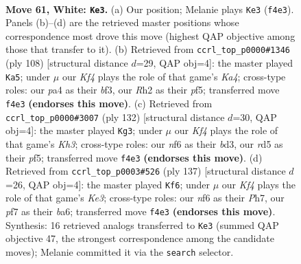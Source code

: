 \documentclass[11pt]{article}
\begin{document}
\clearpage

\begin{figure}[p]\centering
\begin{subfigure}{0.46\textwidth}\centering
\resizebox{\linewidth}{!}{%
\newchessgame
\chessboard[
  setfen={7k/5p2/5n2/3r4/pB3K1p/P4P1P/7R/8 w - - 1 61},
  showmover=false,
  pgfstyle=straightmove, color=movearrow, markmove={f4-e3}
]}
\caption{}
\end{subfigure}\hfill
\begin{subfigure}{0.46\textwidth}\centering
\resizebox{\linewidth}{!}{%
\newchessgame
\chessboard[
  setfen={8/7p/3B3P/2P2pp1/K1k5/P4bP1/8/8 w - - 1 55},
  showmover=false,
  pgfstyle=straightmove, color=movearrow, markmove={a4-a5}
]}
\caption{}
\end{subfigure}
\\[4pt]
\begin{subfigure}{0.46\textwidth}\centering
\resizebox{\linewidth}{!}{%
\newchessgame
\chessboard[
  setfen={8/7p/2p5/5p1k/p4P2/P1Bb3K/1P5P/8 w - - 17 67},
  showmover=false,
  pgfstyle=straightmove, color=movearrow, markmove={h3-g3}
]}
\caption{}
\end{subfigure}\hfill
\begin{subfigure}{0.46\textwidth}\centering
\resizebox{\linewidth}{!}{%
\newchessgame
\chessboard[
  setfen={3R4/2r4p/Bp2k3/2b2p1P/P1P2P2/8/6K1/8 b - - 58 69},
  showmover=false,
  pgfstyle=straightmove, color=movearrow, markmove={e6-f6}
]}
\caption{}
\end{subfigure}
\caption{\textbf{Move 61, White: \texttt{Ke3}.} (a) Our position; Melanie plays \texttt{Ke3} (\texttt{f4e3}). Panels (b)--(d) are the retrieved master positions whose correspondence most drove this move (highest QAP objective among those that transfer to it). (b) Retrieved from \texttt{ccrl\_top\_p0000\#1346} (ply 108) [structural distance $d$=29, QAP obj=4]: the master played \texttt{Ka5}; under $\mu$ our \emph{Kf4} plays the role of that game's \emph{Ka4}; cross-type roles: our \emph{p}a4 as their \emph{b}f3, our \emph{R}h2 as their \emph{p}f5; transferred move \texttt{f4e3} \textbf{(endorses this move)}. (c) Retrieved from \texttt{ccrl\_top\_p0000\#3007} (ply 132) [structural distance $d$=30, QAP obj=4]: the master played \texttt{Kg3}; under $\mu$ our \emph{Kf4} plays the role of that game's \emph{Kh3}; cross-type roles: our \emph{n}f6 as their \emph{b}d3, our \emph{r}d5 as their \emph{p}f5; transferred move \texttt{f4e3} \textbf{(endorses this move)}. (d) Retrieved from \texttt{ccrl\_top\_p0003\#526} (ply 137) [structural distance $d$=26, QAP obj=4]: the master played \texttt{Kf6}; under $\mu$ our \emph{Kf4} plays the role of that game's \emph{Ke3}; cross-type roles: our \emph{n}f6 as their \emph{P}h7, our \emph{p}f7 as their \emph{b}a6; transferred move \texttt{f4e3} \textbf{(endorses this move)}. Synthesis: 16 retrieved analogs transferred to \texttt{Ke3} (summed QAP objective 47, the strongest correspondence among the candidate moves); Melanie committed it via the \texttt{search} selector.}
\label{fig:thought-m120}
\end{figure}
\end{document}
